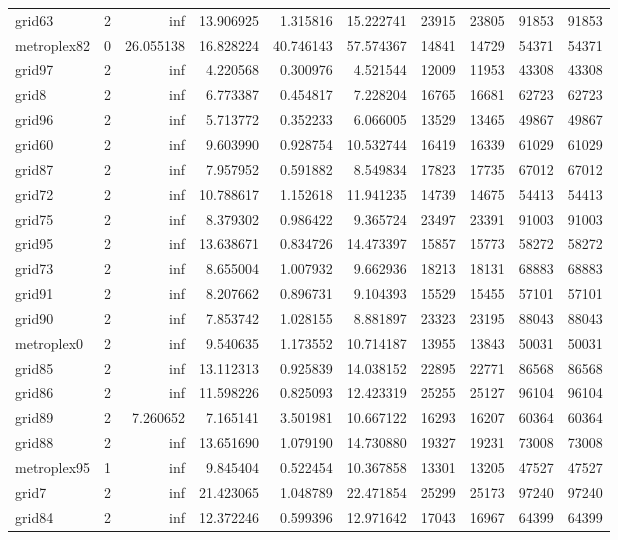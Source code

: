 \begin{longtable}{|l|r|r|r|r|r|r|r|r|r|}
grid63 & 2 & inf & 13.906925 & 1.315816 & 15.222741 & 23915 & 23805 & 91853 & 91853 \\
metroplex82 & 0 & 26.055138 & 16.828224 & 40.746143 & 57.574367 & 14841 & 14729 & 54371 & 54371 \\
grid97 & 2 & inf & 4.220568 & 0.300976 & 4.521544 & 12009 & 11953 & 43308 & 43308 \\
grid8 & 2 & inf & 6.773387 & 0.454817 & 7.228204 & 16765 & 16681 & 62723 & 62723 \\
grid96 & 2 & inf & 5.713772 & 0.352233 & 6.066005 & 13529 & 13465 & 49867 & 49867 \\
grid60 & 2 & inf & 9.603990 & 0.928754 & 10.532744 & 16419 & 16339 & 61029 & 61029 \\
grid87 & 2 & inf & 7.957952 & 0.591882 & 8.549834 & 17823 & 17735 & 67012 & 67012 \\
grid72 & 2 & inf & 10.788617 & 1.152618 & 11.941235 & 14739 & 14675 & 54413 & 54413 \\
grid75 & 2 & inf & 8.379302 & 0.986422 & 9.365724 & 23497 & 23391 & 91003 & 91003 \\
grid95 & 2 & inf & 13.638671 & 0.834726 & 14.473397 & 15857 & 15773 & 58272 & 58272 \\
grid73 & 2 & inf & 8.655004 & 1.007932 & 9.662936 & 18213 & 18131 & 68883 & 68883 \\
grid91 & 2 & inf & 8.207662 & 0.896731 & 9.104393 & 15529 & 15455 & 57101 & 57101 \\
grid90 & 2 & inf & 7.853742 & 1.028155 & 8.881897 & 23323 & 23195 & 88043 & 88043 \\
metroplex0 & 2 & inf & 9.540635 & 1.173552 & 10.714187 & 13955 & 13843 & 50031 & 50031 \\
grid85 & 2 & inf & 13.112313 & 0.925839 & 14.038152 & 22895 & 22771 & 86568 & 86568 \\
grid86 & 2 & inf & 11.598226 & 0.825093 & 12.423319 & 25255 & 25127 & 96104 & 96104 \\
grid89 & 2 & 7.260652 & 7.165141 & 3.501981 & 10.667122 & 16293 & 16207 & 60364 & 60364 \\
grid88 & 2 & inf & 13.651690 & 1.079190 & 14.730880 & 19327 & 19231 & 73008 & 73008 \\
metroplex95 & 1 & inf & 9.845404 & 0.522454 & 10.367858 & 13301 & 13205 & 47527 & 47527 \\
grid7 & 2 & inf & 21.423065 & 1.048789 & 22.471854 & 25299 & 25173 & 97240 & 97240 \\
grid84 & 2 & inf & 12.372246 & 0.599396 & 12.971642 & 17043 & 16967 & 64399 & 64399 \\

\end{longtable}
